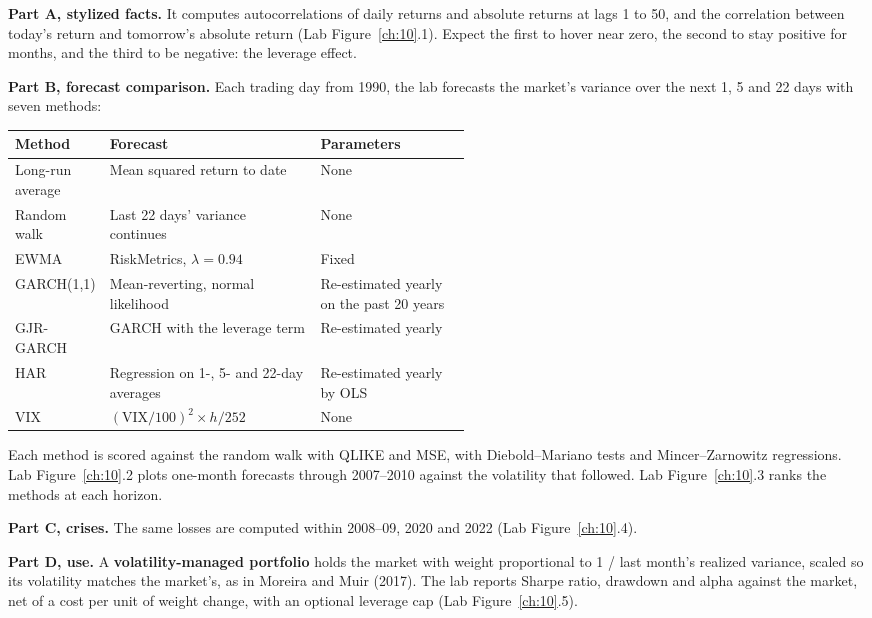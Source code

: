 \textbf{Part A, stylized facts.} It computes autocorrelations of daily returns and absolute returns at lags 1 to 50, and the correlation between today's return and tomorrow's absolute return (Lab Figure~\ref{ch:10}.1). Expect the first to hover near zero, the second to stay positive for months, and the third to be negative: the leverage effect.

\textbf{Part B, forecast comparison.} Each trading day from 1990, the lab forecasts the market's variance over the next 1, 5 and 22 days with seven methods:

\begin{center}
\small
\begin{tabularx}{0.9\linewidth}{@{}>{\raggedright\arraybackslash}p{0.20\linewidth}>{\raggedright\arraybackslash}X>{\raggedright\arraybackslash}p{0.33\linewidth}@{}}
\toprule
Method & Forecast & Parameters \\
\midrule
Long-run average & Mean squared return to date & None \\
Random walk & Last 22 days' variance continues & None \\
EWMA & RiskMetrics, $\lambda = 0.94$ & Fixed \\
GARCH(1,1) & Mean-reverting, normal likelihood & Re-estimated yearly on the past 20 years \\
GJR-GARCH & GARCH with the leverage term & Re-estimated yearly \\
HAR & Regression on 1-, 5- and 22-day averages & Re-estimated yearly by OLS \\
VIX & $(\mathrm{VIX}/100)^2 \times h/252$ & None \\
\bottomrule
\end{tabularx}
\end{center}

Each method is scored against the random walk with QLIKE and MSE, with Diebold--Mariano tests and Mincer--Zarnowitz regressions. Lab Figure~\ref{ch:10}.2 plots one-month forecasts through 2007--2010 against the volatility that followed. Lab Figure~\ref{ch:10}.3 ranks the methods at each horizon.

\textbf{Part C, crises.} The same losses are computed within 2008--09, 2020 and 2022 (Lab Figure~\ref{ch:10}.4).

\textbf{Part D, use.} A \textbf{volatility-managed portfolio} holds the market with weight proportional to 1 / last month's realized variance, scaled so its volatility matches the market's, as in Moreira and Muir (2017). The lab reports Sharpe ratio, drawdown and alpha against the market, net of a cost per unit of weight change, with an optional leverage cap (Lab Figure~\ref{ch:10}.5).

